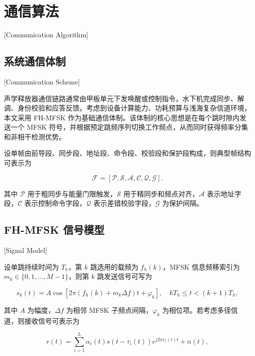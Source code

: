 \chapter{通信算法}[Communication Algorithm]
\label{chap03}

\section{系统通信体制}[Communication Scheme]

声学释放器通信链路通常由甲板单元下发唤醒或控制指令，水下机完成同步、解调、身份校验和应答反馈。考虑到设备计算能力、功耗预算与浅海复杂信道环境，本文采用 FH-MFSK 作为基础通信体制。该体制的核心思想是在每个跳时隙内发送一个 MFSK 符号，并根据预定跳频序列切换工作频点，从而同时获得频率分集和非相干检测优势\cite{LiBoDuoYongHuShuiShengFHMFSKTongXinJiShuLiLunYuShiXianYanJiu2018,liuFHFSKRemoteControl2021}。

设单帧由前导段、同步段、地址段、命令段、校验段和保护段构成，则典型帧结构可表示为

\begin{equation}
  \mathcal{F}=\left[\mathcal{P},\mathcal{S},\mathcal{A},\mathcal{C},\mathcal{Q},\mathcal{G}\right].
\end{equation}

其中 $\mathcal{P}$ 用于粗同步与能量门限触发，$\mathcal{S}$ 用于精同步和频点对齐，$\mathcal{A}$ 表示地址字段，$\mathcal{C}$ 表示控制命令字段，$\mathcal{Q}$ 表示差错校验字段，$\mathcal{G}$ 为保护间隔。

\section{FH-MFSK 信号模型}[Signal Model]

设单跳持续时间为 $T_h$，第 $k$ 跳选用的载频为 $f_h(k)$，MFSK 信息频移索引为 $m_k \in \{0,1,\ldots,M-1\}$，则第 $k$ 跳发送信号可写为

\begin{equation}
  s_k(t)=A\cos\left[2\pi\left(f_h(k)+m_k\Delta f\right)t+\varphi_k\right],\quad kT_h \leq t < (k+1)T_h,
  \label{eq:fhmfsk_signal}
\end{equation}

其中 $A$ 为幅度，$\Delta f$ 为相邻 MFSK 子频点间隔，$\varphi_k$ 为相位项。若考虑多径信道，则接收信号可表示为

\begin{equation}
  r(t)=\sum_{i=1}^{L} \alpha_i(t)s\left(t-\tau_i(t)\right)e^{j2\pi \nu_i(t)t}+n(t),
  \label{eq:channel_model}
\end{equation}

